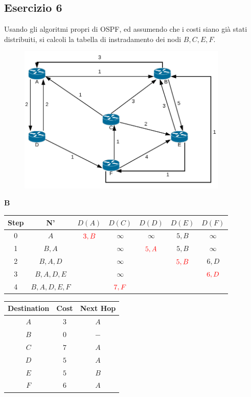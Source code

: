 \documentclass[10pt]{article}
\begin{document}
		\newpage
		
		\subsection{Esercizio 6}
			Usando gli algoritmi propri di OSPF, ed assumendo che i costi siano già stati distribuiti, si calcoli la tabella di instradamento dei nodi ${B,C,E,F}$.
			\begin{figure}[h]
				\centering
				\includegraphics[width=10cm]{es6}
			\end{figure}
			\begin{center}
				\textbf{B}
				\begin{tabular}{||c c c c c c c||} 
					\hline
					Step & N' & $D(A)$ & $D(C)$ & $D(D)$ & $D(E)$ & $D(F)$ \\[0.5ex] 
					\hline\hline
					0 & $A$ & $\color{red} 3,B$ & $\infty$ & $\infty$ & $5,B$ & $\infty$ \\
					\hline
					1 & $B,A$ & & $\infty$ & $\color{red} 5,A$ & $5,B$ & $\infty$ \\
					\hline
					2 & $B,A,D$ & & $\infty$ & & $\color{red} 5,B$ & $6,D$ \\
					\hline
					3 & $B,A,D,E$ & & $\infty$ & & & $\color{red} 6,D$ \\
					\hline
					4 & $B,A,D,E,F$ & & $\color{red} 7,F$ & & & \\
					\hline
				\end{tabular}
				\quad
				\begin{tabular}{||c || c || c||}
					\hline
					Destination & Cost & Next Hop\\[0.5ex] 
					\hline\hline
					$A$ & $3$ & $A$ \\
					$B$ & $0$ & $-$ \\
					$C$ & $7$ & $A$ \\
					$D$ & $5$ & $A$ \\
					$E$ & $5$ & $B$ \\
					$F$ & $6$ & $A$ \\[0.5ex]
					\hline
				\end{tabular}
			\end{center}
			
\end{document}
